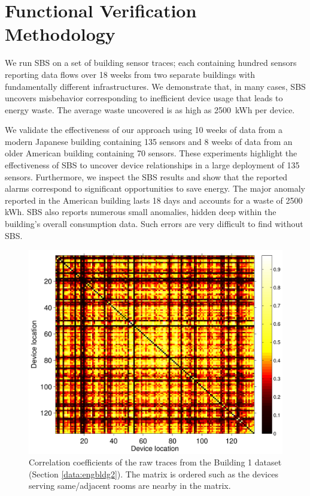 \section{Functional Verification Methodology}
We run SBS on a set of building sensor traces; each containing hundred sensors reporting data flows over 18 weeks from two separate buildings with fundamentally different infrastructures.  
We demonstrate that, in many cases, SBS uncovers misbehavior corresponding to inefficient device usage that leads to energy waste.  
The average waste uncovered is as high as 2500~kWh per device. 

We validate the effectiveness of our approach using 10 weeks of data from a modern Japanese building containing 135 sensors and 
8 weeks of data from an older American building containing 70 sensors.
These experiments highlight the effectiveness of SBS to uncover device relationships in a large deployment of 135 sensors.
Furthermore, we inspect the SBS results and show that the reported alarms correspond to significant opportunities to save energy.
The major anomaly reported in the American building lasts 18 days and accounts for a waste of 2500 kWh. %
SBS also reports numerous small anomalies, hidden deep within the building's overall consumption data.  Such errors are very difficult to find
without SBS.

\begin{figure}
\begin{center}
\includegraphics[width=.5\textwidth]{figs/heatMap_raw_201106-eps-converted-to.pdf}
\caption{Correlation coefficients of the raw traces from the Building 1 dataset (Section \ref{data:engbldg2}).
The matrix is ordered such as the devices serving same/adjacent rooms are nearby in the matrix.}
\label{fig:heatmap:raw}
\end{center}
\end{figure}

